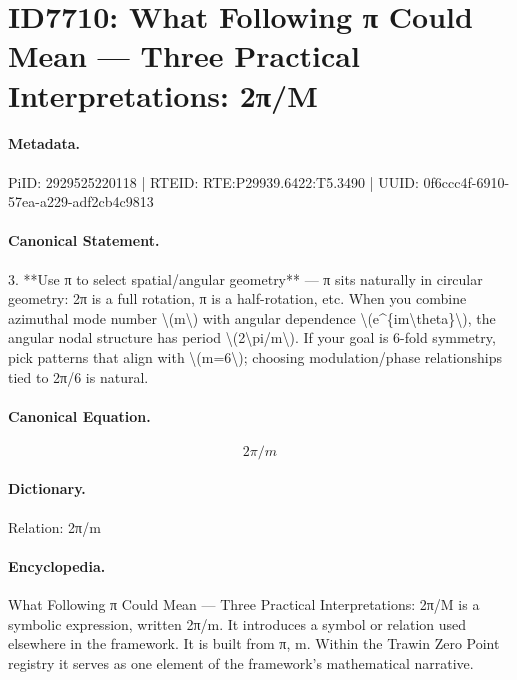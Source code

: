 \section*{ID7710: What Following π Could Mean — Three Practical Interpretations: 2π/M}
\paragraph{Metadata.}
PiID: 2929525220118 | RTEID: RTE:P29939.6422:T5.3490 | UUID: 0f6ccc4f-6910-57ea-a229-adf2cb4c9813

\paragraph{Canonical Statement.}
3. **Use π to select spatial/angular geometry** — π sits naturally in circular geometry: 2π is a full rotation, π is a half-rotation, etc. When you combine azimuthal mode number \textbackslash{}(m\textbackslash{}) with angular dependence \textbackslash{}(e\textasciicircum{}\{im\textbackslash{}theta\}\textbackslash{}), the angular nodal structure has period \textbackslash{}(2\textbackslash{}pi/m\textbackslash{}). If your goal is 6-fold symmetry, pick patterns that align with \textbackslash{}(m=6\textbackslash{}); choosing modulation/phase relationships tied to 2π/6 is natural.

\paragraph{Canonical Equation.}
\[
2\pi/m
\]

\paragraph{Dictionary.}
Relation: 2π/m

\paragraph{Encyclopedia.}
What Following π Could Mean — Three Practical Interpretations: 2π/M is a symbolic expression, written 2π/m. It introduces a symbol or relation used elsewhere in the framework. It is built from π, m. Within the Trawin Zero Point registry it serves as one element of the framework's mathematical narrative.
